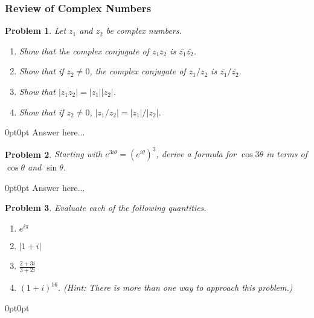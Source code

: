 \documentclass[12pt]{article}
\newenvironment{answer}
    {\begin{adjustwidth}{0pt}{0pt}}
    {\end{adjustwidth}}
\newtheorem{problem}{Problem}
\theoremstyle{remark}  %
\begin{document}
\subsubsection{Review of Complex Numbers}
\setcounter{problem}{0}
    \begin{problem}
        Let $z_1$ and $z_2$ be complex numbers.
        \begin{enumerate}[label=(\alph*)]
            \item Show that the complex conjugate of $z_1z_2$ is $\bar{z_1}\bar{z_2}$.
            \item Show that if $z_2\neq 0$, the complex conjugate of $z_1/z_2$ is $\bar{z_1}/\bar{z_2}$.
            \item Show that $|z_1z_2|=|z_1||z_2|$.
            \item Show that if $z_2 \neq 0$, $|z_1/z_2| = |z_1|/|z_2|$.
        \end{enumerate}
    \end{problem}
    \begin{answer}
        Answer here...
    \end{answer}
    \begin{problem}
        Starting with $e^{3i\theta}=(e^{i\theta})^3$, derive a formula for $\cos{3\theta}$ in terms of $\cos{\theta}$ and $\sin{\theta}$.
    \end{problem}
    \begin{answer}
        Answer here...
    \end{answer}
    \begin{problem}
        Evaluate each of the following quantities.
        \begin{enumerate}[label=(\alph*)]
            \item $e^{i\pi}$
            \item $|1+i|$
            \item $\frac{2+3i}{3+2i}$
            \item $(1+i)^{16}$. (Hint: There is more than one way to approach this problem.)
        \end{enumerate}
    \end{problem}
    \begin{answer}

    \end{answer}
\end{document}

